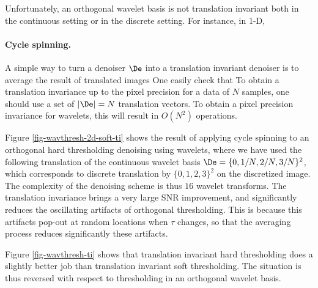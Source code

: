 Unfortunately, an orthogonal wavelet basis 
is not translation invariant both in the continuous setting or in the discrete setting. For instance, in 1-D, 

\paragraph{Cycle spinning.}

A simple way to turn a denoiser $\De$ into a translation invariant denoiser is to average the result of translated images
One easily check that 
To obtain a translation invariance up to the pixel precision for a data of $N$ samples, one should use a set of $|\De|=N$ translation vectors. To obtain a pixel precision invariance for wavelets, this will result in $O(N^2)$ operations.

Figure \ref{fig-wavthresh-2d-soft-ti} shows the result of applying cycle spinning to an orthogonal hard thresholding denoising using wavelets, where we have used the following translation of the continuous wavelet basis
$\De = \{ 0, 1/N, 2/N, 3/N \}^2$, which corresponds to discrete translation by $\{ 0, 1, 2, 3 \}^2$  on the discretized image.
The complexity of the denoising scheme is thus $16$ wavelet transforms. The translation invariance brings a very large SNR improvement, and significantly reduces the oscillating artifacts of orthogonal thresholding. This is because this artifacts pop-out at random locations when $\tau$ changes, so that the averaging process reduces significantly these artifacts.

Figure \ref{fig-wavthresh-ti} shows that translation invariant hard thresholding does a slightly better job than translation invariant soft thresholding. The situation is thus reversed with respect to thresholding in an orthogonal wavelet basis. %



